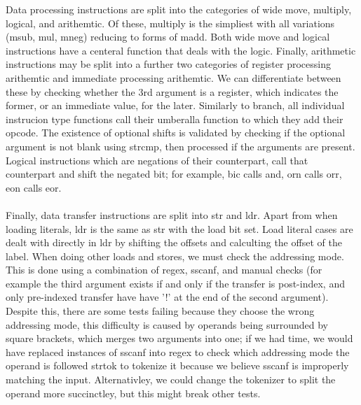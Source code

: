 \documentclass[11pt]{article}
\begin{document}
Data processing instructions are split into the categories of wide move, multiply, logical, and arithemtic. Of these, multiply is the simpliest with all variations (msub, mul, mneg) reducing to forms of madd. Both wide move and logical instructions have a centeral function that deals with the logic. Finally, arithmetic instructions may be split into a further two categories of register processing arithemtic and immediate processing arithemtic. We can differentiate between these by checking whether the 3rd argument is a register, which indicates the former, or an immediate value, for the later. Similarly to branch, all individual instrucion type functions call their umberalla function to which they add their opcode. The existence of optional shifts is validated by checking if the optional argument is not blank using strcmp, then processed if the arguments are present. Logical instructions which are negations of their counterpart, call that counterpart and shift the negated bit; for example, bic calls and, orn calls orr, eon calls eor. \\\\
Finally, data transfer instructions are split into str and ldr. Apart from when loading literals, ldr is the same as str with the load bit set. Load literal cases are dealt with directly in ldr by shifting the offsets and calculting the offset of the label. When doing other loads and stores, we must check the addressing mode.  This is done using a combination of regex, sscanf, and manual checks (for example the third argument exists if and only if the transfer is post-index, and only pre-indexed transfer have have '!' at the end of the second argument). Despite this, there are some tests failing because they choose the wrong addressing mode, this difficulty is caused by operands being surrounded by square brackets, which merges two arguments into one; if we had time, we would have replaced instances of sscanf into regex to check which addressing mode the operand is followed strtok to tokenize it because we believe sscanf is improperly matching the input. Alternativley, we could change the tokenizer to split the operand more succinctley, but this might break other tests.
\end{document}
